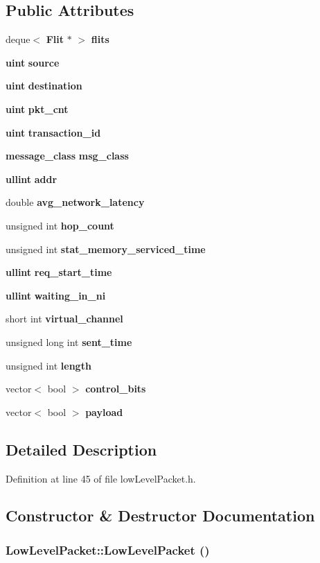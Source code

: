 \subsection*{Public Attributes}
\begin{CompactItemize}
\item 
deque$<$ {\bf Flit} $\ast$ $>$ {\bf flits}
\item 
{\bf uint} {\bf source}
\item 
{\bf uint} {\bf destination}
\item 
{\bf uint} {\bf pkt\_\-cnt}
\item 
{\bf uint} {\bf transaction\_\-id}
\item 
{\bf message\_\-class} {\bf msg\_\-class}
\item 
{\bf ullint} {\bf addr}
\item 
double {\bf avg\_\-network\_\-latency}
\item 
unsigned int {\bf hop\_\-count}
\item 
unsigned int {\bf stat\_\-memory\_\-serviced\_\-time}
\item 
{\bf ullint} {\bf req\_\-start\_\-time}
\item 
{\bf ullint} {\bf waiting\_\-in\_\-ni}
\item 
short int {\bf virtual\_\-channel}
\item 
unsigned long int {\bf sent\_\-time}
\item 
unsigned int {\bf length}
\item 
vector$<$ bool $>$ {\bf control\_\-bits}
\item 
vector$<$ bool $>$ {\bf payload}
\end{CompactItemize}


\subsection{Detailed Description}


Definition at line 45 of file lowLevelPacket.h.

\subsection{Constructor \& Destructor Documentation}
\subsubsection[{LowLevelPacket}]{\setlength{\rightskip}{0pt plus 5cm}LowLevelPacket::LowLevelPacket ()}\label{classLowLevelPacket_550561f33ccae00163b40e963121c156}




